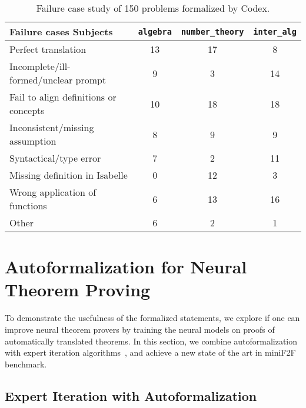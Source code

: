 \documentclass{article}
\begin{document}
\begin{table}[t]
  
  \caption{Failure case study of 150 problems formalized by Codex.}
  \label{tab:failure}
  \centering
  \begin{tabular}{lccc}
    \toprule
    Failure cases  Subjects   & \texttt{algebra} & \texttt{number\_theory} & \texttt{inter\_alg}  \\ 
    \midrule
    Perfect translation  & 13  & 17 & 8   \\
    Incomplete/ill-formed/unclear prompt &  9  & 3 & 14 \\
    Fail to align definitions or concepts &   10  & 18 & 18  \\
    Inconsistent/missing assumption  & 8 & 9 & 9 \\
    Syntactical/type error & 7 & 2 & 11\\
    Missing definition in Isabelle & 0 & 12 & 3\\
    Wrong application of functions & 6 & 13 & 16 \\
    Other & 6 & 2 & 1 \\
    \bottomrule
  \end{tabular}
\end{table}

























\section{Autoformalization for Neural Theorem Proving}
\label{sec: exp}
To demonstrate the usefulness of the formalized statements, we explore if one can improve neural theorem provers by training the neural models on proofs of automatically translated theorems. In this section, we combine autoformalization with expert iteration algorithms~\citep{DBLP:conf/nips/AnthonyTB17}, and achieve a new state of the art in miniF2F benchmark.








\subsection{Expert Iteration with Autoformalization}
\label{subsec: expert}
\end{document}
